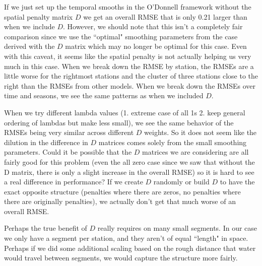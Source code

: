 \documentclass[12pt]{amsart}
\begin{document}
If we just set up the temporal smooths in the O'Donnell framework without the spatial penalty matrix $D$ we get an overall RMSE that is only 0.21 larger than when we include $D$. However, we should note that this isn't a completely fair comparison since we use the ``optimal" smoothing parameters from the case derived with the $D$ matrix which may no longer be optimal for this case. Even with this caveat, it seems like the spatial penalty is not actually helping us very much in this case. When we break down the RMSE by station, the RMSEs are a little worse for the rightmost stations and the cluster of three stations close to the right than the RMSEs from other models. When we break down the RMSEs over time and seasons, we see the same patterns as when we included $D$.

When we try different lambda values (1. extreme case of all 1s 2. keep general ordering of lambdas but make less small), we see the same behavior of the RMSEs being very similar across different $D$ weights. So it does not seem like the dilution in the difference in $D$ matrices comes solely from the small smoothing parameters. Could it be possible that the $D$ matrices we are considering are all fairly good for this problem (even the all zero case since we saw that without the D matrix, there is only a slight increase in the overall RMSE) so it is hard to see a real difference in performance? If we create $D$ randomly or build $D$ to have the exact opposite structure (penalties where there are zeros, no penalties where there are originally penalties), we actually don't get that much worse of an overall RMSE. 

Perhaps the true benefit of $D$ really requires on many small segments. In our case we only have a segment per station, and they aren't of equal ``length" in space. Perhaps if we did some additional scaling based on the rough distance that water would travel between segments, we would capture the structure more fairly.






\textbf{}
\end{document}
